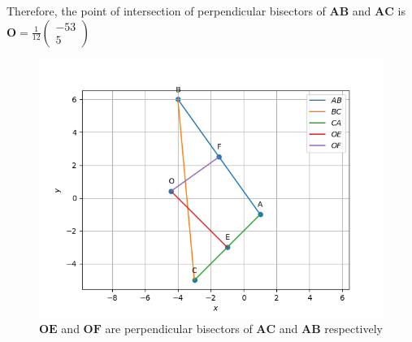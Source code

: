 \documentclass[journal,12pt,twocolumn]{IEEEtran}
\theoremstyle{remark}
\newcommand{\myvec}[1]{\ensuremath{\begin{pmatrix}#1\end{pmatrix}}}
\let\vec\mathbf
\begin{document}
Therefore, the point of intersection of perpendicular bisectors of $\vec{AB}$ and $\vec{AC}$ is $\vec{O} = \frac{1}{12}\myvec{-53\\5}$
\begin{figure}

\centering

\includegraphics[width=\columnwidth]{./figs/Figure_1}

\caption{$\vec{OE}$ and $\vec{OF}$ are perpendicular bisectors of $\vec{AC}$ and $\vec{AB}$ respectively}

\label{fig:Figure_2}

\end{figure}
\end{document}
